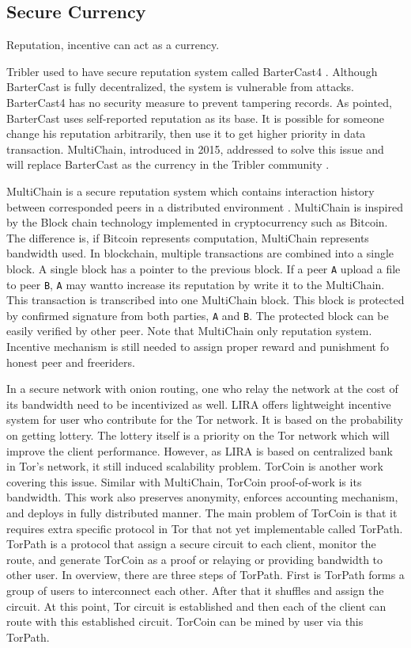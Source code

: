\subsection{Secure Currency}
Reputation, incentive can act as a currency.  

Tribler used to have secure reputation system called BarterCast4 \cite{2009:bartercast:meulpolder}. Although BarterCast is fully decentralized, the system is vulnerable from attacks. BarterCast4 has no security measure to prevent tampering records. As \citeauthor{2015:multichain:norberhuis} pointed, BarterCast uses self-reported reputation as its base. It is possible for someone change his reputation arbitrarily, then use it to get higher priority in data transaction. MultiChain, introduced in 2015, addressed to solve this issue and will replace BarterCast as the currency in the Tribler community \cite{2015:multichain:norberhuis}. 

MultiChain is a secure reputation system which contains interaction history between corresponded peers in a distributed environment \cite{2015:multichain:norberhuis}. MultiChain is inspired by the Block chain technology implemented in cryptocurrency such as Bitcoin. The difference is, if Bitcoin represents computation, MultiChain represents bandwidth used. In blockchain, multiple transactions are combined into a single block. A single block has a pointer to the previous block. If a peer \texttt{A} upload a file to peer \texttt{B}, \texttt{A} may wantto increase its reputation by write it to the MultiChain. This transaction is transcribed into one MultiChain block. This block is protected by confirmed signature from both parties, \texttt{A} and \texttt{B}. The protected block can be easily verified by other peer. Note that MultiChain only reputation system. Incentive mechanism is still needed to assign proper reward and punishment fo honest peer and freeriders.

In a secure network with onion routing, one who relay the network at the cost of its bandwidth need to be incentivized as well. LIRA \cite{2013:lira:jansen} offers lightweight incentive system for user who contribute for the Tor network. It is based on the probability on getting lottery. The lottery itself is a priority on the Tor network which will improve the client performance. However, as LIRA is based on centralized bank in Tor's network, it still induced scalability problem. TorCoin \cite{2014:torcoin:ghosh} is another work covering this issue. Similar with MultiChain, TorCoin proof-of-work is its bandwidth. This work also preserves anonymity, enforces accounting mechanism, and deploys in fully distributed manner. The main problem of TorCoin is that it requires extra specific protocol in Tor that not yet implementable called TorPath. TorPath is a protocol that assign a secure circuit to each client, monitor the route, and generate TorCoin as a proof or relaying or providing bandwidth to other user. In overview, there are three steps of TorPath. First is TorPath forms a group of users to interconnect each other. After that it shuffles and assign the circuit. At this point, Tor circuit is established and then each of the client can route with this established circuit. TorCoin can be mined by user via this TorPath.

